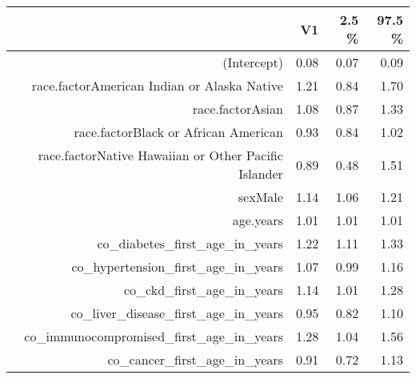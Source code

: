 \begin{table}[ht]
\centering
\begin{tabular}{rrrr}
  \hline
 & V1 & 2.5 \% & 97.5 \% \\ 
  \hline
(Intercept) & 0.08 & 0.07 & 0.09 \\ 
  race.factorAmerican Indian or Alaska Native & 1.21 & 0.84 & 1.70 \\ 
  race.factorAsian & 1.08 & 0.87 & 1.33 \\ 
  race.factorBlack or African American & 0.93 & 0.84 & 1.02 \\ 
  race.factorNative Hawaiian or Other Pacific Islander & 0.89 & 0.48 & 1.51 \\ 
  sexMale & 1.14 & 1.06 & 1.21 \\ 
  age.years & 1.01 & 1.01 & 1.01 \\ 
  co\_diabetes\_first\_age\_in\_years & 1.22 & 1.11 & 1.33 \\ 
  co\_hypertension\_first\_age\_in\_years & 1.07 & 0.99 & 1.16 \\ 
  co\_ckd\_first\_age\_in\_years & 1.14 & 1.01 & 1.28 \\ 
  co\_liver\_disease\_first\_age\_in\_years & 0.95 & 0.82 & 1.10 \\ 
  co\_immunocompromised\_first\_age\_in\_years & 1.28 & 1.04 & 1.56 \\ 
  co\_cancer\_first\_age\_in\_years & 0.91 & 0.72 & 1.13 \\ 
   \hline
\end{tabular}
\end{table}
